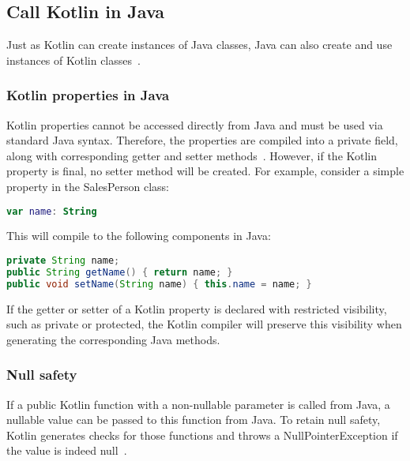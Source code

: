 \documentclass[a4paper,11pt]{article}
\begin{document}
\subsection{Call Kotlin in Java}
Just as Kotlin can create instances of Java classes, Java can also create and use instances of Kotlin classes~\cite{interop-java}.

\subsubsection{Kotlin properties in Java}
Kotlin properties cannot be accessed directly from Java and must be used via standard Java syntax. Therefore, the properties are compiled into a private field, along with corresponding getter and setter methods~\cite{interop-properties}. However, if the Kotlin property is final, no setter method will be created. For example, consider a simple property in the SalesPerson class:
\begin{lstlisting}[language=Kotlin]
var name: String
\end{lstlisting}
This will compile to the following components in Java:
\begin{lstlisting}[language=Java]
private String name;
public String getName() { return name; }
public void setName(String name) { this.name = name; }
\end{lstlisting}
If the getter or setter of a Kotlin property is declared with restricted visibility, such as private or protected, the Kotlin compiler will preserve this visibility when generating the corresponding Java methods.

\subsubsection{Null safety} %
If a public Kotlin function with a non-nullable parameter is called from Java, a nullable value can be passed to this function from Java. To retain null safety, Kotlin generates checks for those functions and throws a NullPointerException if the value is indeed null~\cite{interop-java-null-safety}.
\end{document}
